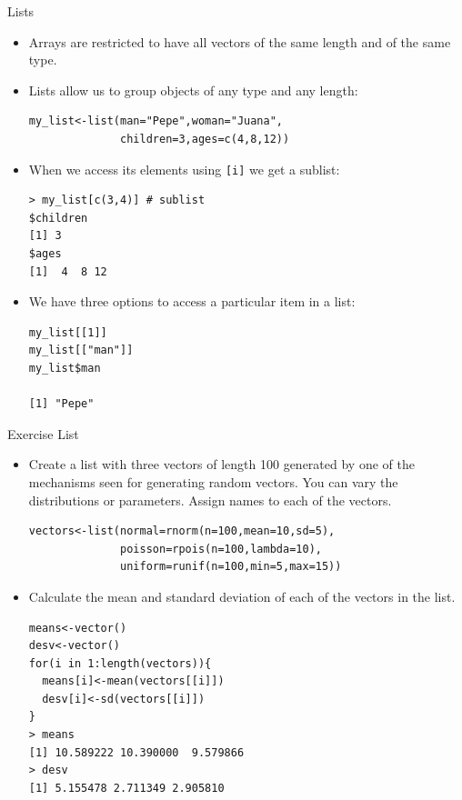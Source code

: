 \documentclass[handout]{beamer}
\begin{document}
\begin{frame}[fragile]{Lists}
\scriptsize{
\begin{itemize}
 \item Arrays are restricted to have all vectors of the same length and of the same type.
 \item Lists allow us to group objects of any type and any length:
 \begin{verbatim}
my_list<-list(man="Pepe",woman="Juana",
              children=3,ages=c(4,8,12))
 \end{verbatim}
 \item When we access its elements using \verb+[i]+ we get a sublist:
 \begin{verbatim}
> my_list[c(3,4)] # sublist
$children
[1] 3
$ages
[1]  4  8 12
 \end{verbatim}
\item We have three options to access a particular item in a list:
\begin{verbatim}
my_list[[1]]
my_list[["man"]]
my_list$man

[1] "Pepe"
\end{verbatim}


\end{itemize}



}
\end{frame}

\begin{frame}[fragile]{Exercise List}
\scriptsize{

\begin{itemize}
 \item Create a list with three vectors of length 100 generated by one of the mechanisms seen for generating random vectors. You can vary the distributions or parameters. Assign names to each of the vectors.
 \begin{verbatim}
vectors<-list(normal=rnorm(n=100,mean=10,sd=5),
              poisson=rpois(n=100,lambda=10),
              uniform=runif(n=100,min=5,max=15))
 \end{verbatim}

\item Calculate the mean and standard deviation of each of the vectors in the list. 
\begin{verbatim}
means<-vector()
desv<-vector()
for(i in 1:length(vectors)){
  means[i]<-mean(vectors[[i]])
  desv[i]<-sd(vectors[[i]])
}
> means
[1] 10.589222 10.390000  9.579866
> desv
[1] 5.155478 2.711349 2.905810
\end{verbatim}

 
\end{itemize}

}
\end{frame}
\end{document}

